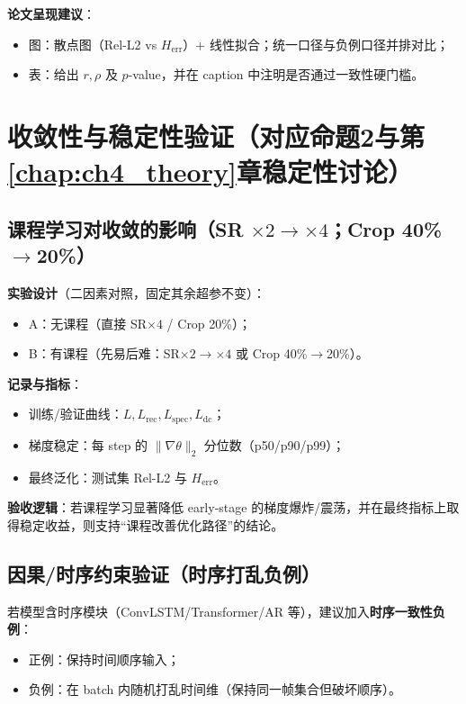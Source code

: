 \textbf{论文呈现建议}：
\begin{itemize}
  \item 图：散点图（Rel-L2 vs $H_{\mathrm{err}}$）+ 线性拟合；统一口径与负例口径并排对比；
  \item 表：给出 $r,\rho$ 及 $p$-value，并在 caption 中注明是否通过一致性硬门槛。
\end{itemize}

\section{收敛性与稳定性验证（对应命题2与第\ref{chap:ch4_theory}章稳定性讨论）}

\subsection{课程学习对收敛的影响（SR \texorpdfstring{$\times2\rightarrow\times4$}{x2->x4}；Crop 40\%\texorpdfstring{$\rightarrow$}{->}20\%）}
\textbf{实验设计}（二因素对照，固定其余超参不变）：
\begin{itemize}
  \item A：无课程（直接 SR$\times4$ / Crop 20\%）；
  \item B：有课程（先易后难：SR$\times2\rightarrow\times4$ 或 Crop 40\%$\rightarrow$20\%）。
\end{itemize}

\textbf{记录与指标}：
\begin{itemize}
  \item 训练/验证曲线：$L, L_{\mathrm{rec}}, L_{\mathrm{spec}}, L_{\mathrm{dc}}$；
  \item 梯度稳定：每 step 的 $\|\nabla\theta\|_2$ 分位数（p50/p90/p99）；
  \item 最终泛化：测试集 Rel-L2 与 $H_{\mathrm{err}}$。
\end{itemize}

\textbf{验收逻辑}：若课程学习显著降低 early-stage 的梯度爆炸/震荡，并在最终指标上取得稳定收益，则支持“课程改善优化路径”的结论。

\subsection{因果/时序约束验证（时序打乱负例）}
若模型含时序模块（ConvLSTM/Transformer/AR 等），建议加入\textbf{时序一致性负例}：
\begin{itemize}
  \item 正例：保持时间顺序输入；
  \item 负例：在 batch 内随机打乱时间维（保持同一帧集合但破坏顺序）。
\end{itemize}


